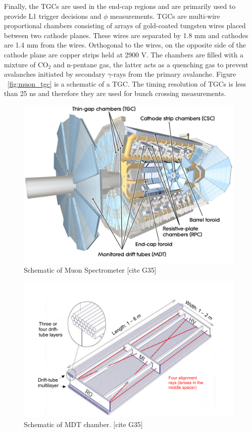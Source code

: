 Finally, the TGCs are used in the end-cap regions and are primarily used to provide L1 trigger decisions and $\phi$ measurements. TGCs are multi-wire proportional chambers consisting of arrays of gold-coated tungsten wires placed between two cathode planes. These wires are separated by 1.8 mm and cathodes are 1.4 mm from the wires. Orthogonal to the wires, on the opposite side of the cathode plane are copper strips held at 2900 V. The chambers are filled with a mixture of CO$_{2}$ and n-pentane gas, the latter acts as a quenching gas to prevent avalanches initiated by secondary $\gamma$-rays from the primary avalanche. Figure ~\ref{fig:muon_tgc} is a schematic of a TGC. The timing resolution of TGCs is less than 25 ns and therefore they are used for bunch crossing measurements. 

\begin{figure}[h!]
  \centering
  \includegraphics[width=\hsize]{figures/Detector/muonsys.pdf}
  \caption{Schematic of Muon Spectrometer [cite G35]} 
  \label{fig:muonsys}
\end{figure}
\FloatBarrier


\begin{figure}[h!]
  \centering
  \includegraphics[width=\hsize]{figures/Detector/muon_mdt.pdf}
  \caption{Schematic of MDT chamber. [cite G35]} 
  \label{fig:muon_mdt}
\end{figure}
\FloatBarrier


